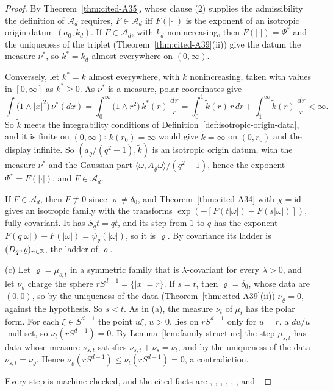 \begin{proof}
By Theorem~\ref{thm:cited-A35}, whose clause (2)
supplies the admissibility the definition of $\mathcal{A}_d$ requires, $F \in \mathcal{A}_d$ iff
$F(|\cdot|)$ is the exponent of an isotropic origin datum $(a_0, k_d)$. If $F \in \mathcal{A}_d$,
with $k_d$ nonincreasing, then $F(|\cdot|) = \Psi^*$ and the uniqueness of the triplet
(Theorem~\ref{thm:cited-A39}(ii)) give the datum the \Levy{} measure $\nu^*$, so
$k^* = k_d$ almost everywhere on $(0,\infty)$.

Conversely, let $k^* = \tilde k$ almost everywhere, with $\tilde k$ nonincreasing, taken with values
in $[0, \infty]$ as $k^* \ge 0$. As $\nu^*$ is a \Levy{} measure, polar coordinates give
\[
  \int\bigl(1 \wedge |x|^2\bigr)\,\nu^*(dx) = \int_0^\infty\bigl(1 \wedge r^2\bigr)\,k^*(r)\,\frac{dr}{r}
  = \int_0^1\tilde k(r)\,r\,dr + \int_1^\infty\tilde k(r)\,\frac{dr}{r} < \infty.
\]
So $\tilde k$ meets the integrability conditions of Definition~\ref{def:isotropic-origin-data}, and
it is finite on $(0,\infty)$: $\tilde k(r_0) = \infty$ would give $\tilde k = \infty$ on $(0, r_0)$
and the display infinite. So $(a_\varrho/(q^2 - 1), \tilde k)$ is an isotropic origin datum, with
the \Levy{} measure $\nu^*$ and the Gaussian part $\langle\omega, A_\varrho\omega\rangle/(q^2 - 1)$,
hence the exponent $\Psi^* = F(|\cdot|)$, and $F \in \mathcal{A}_d$.

If $F \in \mathcal{A}_d$, then $F \not\equiv 0$ since $\varrho \ne \delta_0$, and
Theorem~\ref{thm:cited-A34} with $\chi = \mathrm{id}$ gives an isotropic family with the
transforms $\exp(-[F(t|\omega|) - F(s|\omega|)])$, fully covariant. It has $S_qt = qt$, and its step
from $1$ to $q$ has the exponent $F(q|\omega|) - F(|\omega|) = \psi_\varrho(|\omega|)$, so it is
$\varrho$. By covariance its ladder is $(D_{q^n}\varrho)_{n \in \mathbb{Z}}$, the ladder of $\varrho$.

(c) Let $\varrho = \mu_{s,t}$ in a symmetric family that is $\lambda$-covariant for every
$\lambda > 0$, and let $\nu_\varrho$ charge the sphere $rS^{d-1} = \{|x| = r\}$. If $s = t$, then
$\varrho = \delta_0$, whose data are $(0, 0)$, so by the uniqueness of the data
(Theorem~\ref{thm:cited-A39}(ii)) $\nu_\varrho = 0$, against the hypothesis. So $s < t$.
As in (a), the \Levy{} measure $\nu_t$ of $\mu_t$ has the polar form. For each $\xi \in S^{d-1}$ the point
$u\xi$, $u > 0$, lies on $rS^{d-1}$ only for $u = r$, a $du/u$-null set, so $\nu_t(rS^{d-1}) = 0$. By
Lemma~\ref{lem:family-structure} the step $\mu_{s,t}$ has data whose \Levy{} measure $\nu_{s,t}$
satisfies $\nu_{s,t} + \nu_s = \nu_t$, and by the uniqueness of the data $\nu_{s,t} = \nu_\varrho$.
Hence $\nu_\varrho(rS^{d-1}) \le \nu_t(rS^{d-1}) = 0$, a contradiction.

Every step is machine-checked, and the cited facts are , , ,
, , ,  and .
\end{proof}

